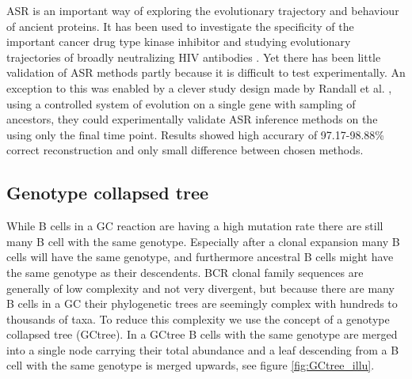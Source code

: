 ASR is an important way of exploring the evolutionary trajectory and behaviour of ancient proteins.
It has been used to investigate the specificity of the important cancer drug type kinase inhibitor \cite{Wilson2015-vi} and studying evolutionary trajectories of broadly neutralizing HIV antibodies \cite{Doria-Rose2014-vi}.
Yet there has been little validation of ASR methods partly because it is difficult to test experimentally.
An exception to this was enabled by a clever study design made by Randall et al. \cite{randall2016experimental}, using a controlled system of evolution on a single gene with sampling of ancestors, they could experimentally validate ASR inference methods on the using only the final time point.
Results showed high accurary of 97.17-98.88\% correct reconstruction and only small difference between chosen methods.




\subsection{Genotype collapsed tree}
While B cells in a GC reaction are having a high mutation rate there are still many B cell with the same genotype.
Especially after a clonal expansion many B cells will have the same genotype, and furthermore ancestral B cells might have the same genotype as their descendents.
BCR clonal family sequences are generally of low complexity and not very divergent, but because there are many B cells in a GC their phylogenetic trees are seemingly complex with hundreds to thousands of taxa.
To reduce this complexity we use the concept of a genotype collapsed tree (GCtree).
In a GCtree B cells with the same genotype are merged into a single node carrying their total abundance and a leaf descending from a B cell with the same genotype is merged upwards, see figure \ref{fig:GCtree_illu}.

